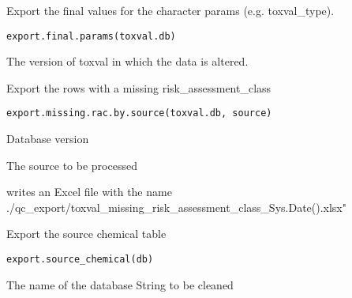 \documentclass[letterpaper]{book}
\begin{document}
%
\begin{Description}\relax
Export the final values for the character params (e.g. toxval\_type).
\end{Description}
%
\begin{Usage}
\begin{verbatim}
export.final.params(toxval.db)
\end{verbatim}
\end{Usage}
%
\begin{Arguments}
\begin{ldescription}
\item[\code{toxval.db}] The version of toxval in which the data is altered.
\end{ldescription}
\end{Arguments}
%
\begin{Description}\relax
Export the rows with a missing risk\_assessment\_class
\end{Description}
%
\begin{Usage}
\begin{verbatim}
export.missing.rac.by.source(toxval.db, source)
\end{verbatim}
\end{Usage}
%
\begin{Arguments}
\begin{ldescription}
\item[\code{toxval.db}] Database version

\item[\code{source}] The source to be processed
\end{ldescription}
\end{Arguments}
%
\begin{Value}
writes an Excel file with the name
./qc\_export/toxval\_missing\_risk\_assessment\_class\_Sys.Date().xlsx"
\end{Value}
%
\begin{Description}\relax
Export the source chemical table
\end{Description}
%
\begin{Usage}
\begin{verbatim}
export.source_chemical(db)
\end{verbatim}
\end{Usage}
%
\begin{Arguments}
\begin{ldescription}
\item[\code{db}] The name of the database String to be cleaned
\end{ldescription}
\end{Arguments}
\end{document}
